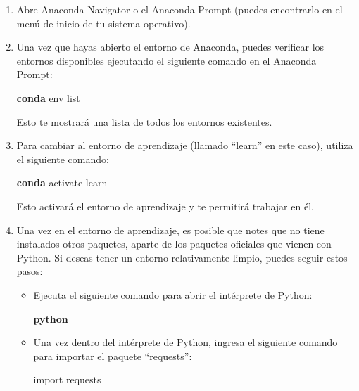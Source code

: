 \documentclass[
  letterpaper,
  DIV=11,
  numbers=noendperiod]{scrartcl}
\newenvironment{Shaded}{}{}
\newcommand{\ExtensionTok}[1]{\textcolor[rgb]{0.84,0.23,0.29}{\textbf{#1}}}
\newcommand{\ImportTok}[1]{\textcolor[rgb]{0.01,0.18,0.38}{#1}}
\newcommand{\NormalTok}[1]{\textcolor[rgb]{0.14,0.16,0.18}{#1}}
\begin{document}
\begin{enumerate}
\def\labelenumi{\arabic{enumi}.}
\item
  Abre Anaconda Navigator o el Anaconda Prompt (puedes encontrarlo en el
  menú de inicio de tu sistema operativo).
\item
  Una vez que hayas abierto el entorno de Anaconda, puedes verificar los
  entornos disponibles ejecutando el siguiente comando en el Anaconda
  Prompt:

\begin{Shaded}
\begin{Highlighting}[]
\ExtensionTok{conda}\NormalTok{ env list}
\end{Highlighting}
\end{Shaded}

  Esto te mostrará una lista de todos los entornos existentes.
\item
  Para cambiar al entorno de aprendizaje (llamado ``learn'' en este
  caso), utiliza el siguiente comando:

\begin{Shaded}
\begin{Highlighting}[]
\ExtensionTok{conda}\NormalTok{ activate learn}
\end{Highlighting}
\end{Shaded}

  Esto activará el entorno de aprendizaje y te permitirá trabajar en él.
\item
  Una vez en el entorno de aprendizaje, es posible que notes que no
  tiene instalados otros paquetes, aparte de los paquetes oficiales que
  vienen con Python. Si deseas tener un entorno relativamente limpio,
  puedes seguir estos pasos:

  \begin{itemize}
  \item
    Ejecuta el siguiente comando para abrir el intérprete de Python:

\begin{Shaded}
\begin{Highlighting}[]
\ExtensionTok{python}
\end{Highlighting}
\end{Shaded}
  \item
    Una vez dentro del intérprete de Python, ingresa el siguiente
    comando para importar el paquete ``requests'':

\begin{Shaded}
\begin{Highlighting}[]
\ImportTok{import}\NormalTok{ requests}
\end{Highlighting}
\end{Shaded}


\end{itemize}
\end{enumerate}
\end{document}
